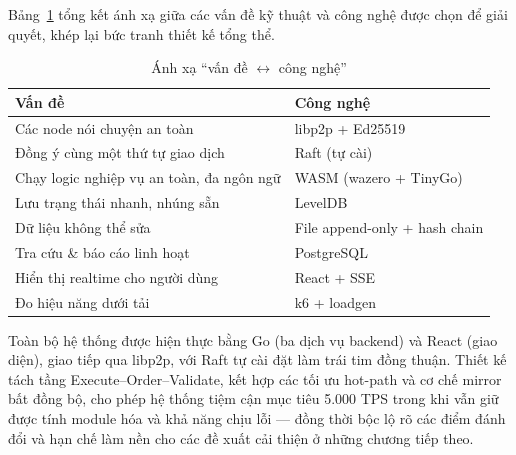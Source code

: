 Bảng~\ref{tab:tech-problem} tổng kết ánh xạ giữa các vấn đề kỹ thuật và công
nghệ được chọn để giải quyết, khép lại bức tranh thiết kế tổng thể.

\begin{table}[H]
\centering
\caption{Ánh xạ ``vấn đề $\leftrightarrow$ công nghệ''}
\label{tab:tech-problem}
\begin{tabular}{@{}p{6.4cm}p{6cm}@{}}
\toprule
\textbf{Vấn đề} & \textbf{Công nghệ} \\
\midrule
Các node nói chuyện an toàn & libp2p + Ed25519 \\
Đồng ý cùng một thứ tự giao dịch & Raft (tự cài) \\
Chạy logic nghiệp vụ an toàn, đa ngôn ngữ & WASM (wazero + TinyGo) \\
Lưu trạng thái nhanh, nhúng sẵn & LevelDB \\
Dữ liệu không thể sửa & File append-only + hash chain \\
Tra cứu \& báo cáo linh hoạt & PostgreSQL \\
Hiển thị realtime cho người dùng & React + SSE \\
Đo hiệu năng dưới tải & k6 + loadgen \\
\bottomrule
\end{tabular}
\end{table}

Toàn bộ hệ thống được hiện thực bằng Go (ba dịch vụ backend) và React (giao
diện), giao tiếp qua libp2p, với Raft tự cài đặt làm trái tim đồng thuận. Thiết
kế tách tầng Execute--Order--Validate, kết hợp các tối ưu hot-path và cơ chế
mirror bất đồng bộ, cho phép hệ thống tiệm cận mục tiêu 5.000 TPS trong khi vẫn
giữ được tính module hóa và khả năng chịu lỗi --- đồng thời bộc lộ rõ các điểm
đánh đổi và hạn chế làm nền cho các đề xuất cải thiện ở những chương tiếp theo.
